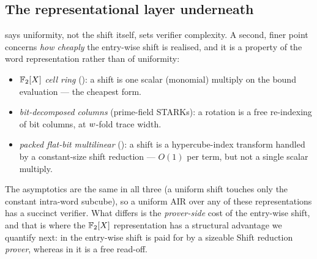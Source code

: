 \subsection{The representational layer underneath}
\label{sec:shifts-repr}

 says uniformity, not the shift itself, sets
verifier complexity. A second, finer point concerns \emph{how cheaply}
the entry-wise shift is realised, and it is a property of the word
representation rather than of uniformity:
\begin{itemize}
  \item \emph{$\mathbb{F}_2[X]$ cell ring} (\zinc{}): a shift is one scalar
  (monomial) multiply on the bound evaluation --- the cheapest form.
  \item \emph{bit-decomposed columns} (prime-field STARKs): a rotation is
  a free re-indexing of bit columns, at $w$-fold trace width.
  \item \emph{packed flat-bit multilinear} (\binius{}): a shift is a
  hypercube-index transform handled by a constant-size shift reduction
  --- $O(1)$ per term, but not a single scalar multiply.
\end{itemize}
The asymptotics are the same in all three (a uniform shift touches only
the constant intra-word subcube), so a uniform AIR over any of these
representations has a succinct verifier. What differs is the
\emph{prover-side} cost of the entry-wise shift, and that is where the
$\mathbb{F}_2[X]$ representation has a structural advantage we quantify next:
in \binius{} the entry-wise shift is paid for by a sizeable Shift
reduction \emph{prover}, whereas in \zinc{} it is a free read-off.
